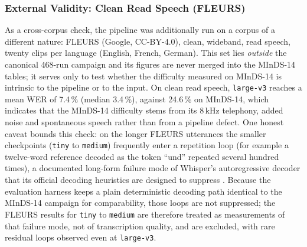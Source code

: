 \documentclass[12pt]{report}
\begin{document}
\subsubsection{External Validity: Clean Read Speech (FLEURS)}
As a cross-corpus check, the pipeline was additionally run on a corpus of a different nature: FLEURS (Google, CC-BY-4.0), clean, wideband, read speech, twenty clips per language (English, French, German). This set lies \emph{outside} the canonical 468-run campaign and its figures are never merged into the MInDS-14 tables; it serves only to test whether the difficulty measured on MInDS-14 is intrinsic to the pipeline or to the input. On clean read speech, \texttt{large-v3} reaches a mean WER of 7.4\,\% (median 3.4\,\%), against 24.6\,\% on MInDS-14, which indicates that the MInDS-14 difficulty stems from its 8\,kHz telephony, added noise and spontaneous speech rather than from a pipeline defect. One honest caveat bounds this check: on the longer FLEURS utterances the smaller checkpoints (\texttt{tiny} to \texttt{medium}) frequently enter a repetition loop (for example a twelve-word reference decoded as the token \enquote{und} repeated several hundred times), a documented long-form failure mode of Whisper's autoregressive decoder that its official decoding heuristics are designed to suppress \cite{radford2023robust,koenecke2024careless}. Because the evaluation harness keeps a plain deterministic decoding path identical to the MInDS-14 campaign for comparability, those loops are not suppressed; the FLEURS results for \texttt{tiny} to \texttt{medium} are therefore treated as measurements of that failure mode, not of transcription quality, and are excluded, with rare residual loops observed even at \texttt{large-v3}.
\end{document}
